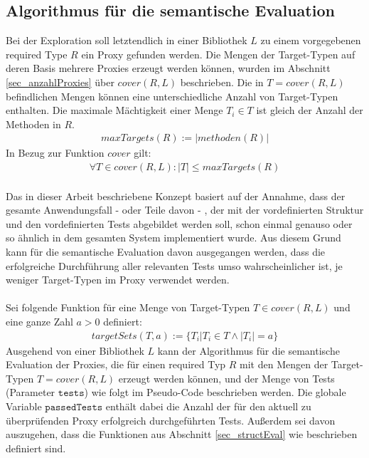 \subsection{Algorithmus für die semantische Evaluation}\label{sec_semEvalAlgo}
Bei der Exploration soll letztendlich in einer Bibliothek $L$ zu einem vorgegebenen required Type $R$ ein Proxy gefunden werden. Die Mengen der Target-Typen auf deren Basis mehrere Proxies erzeugt werden können, wurden im Abschnitt \ref{sec_anzahlProxies} über $\mathit{cover(R,L)}$ beschrieben. Die in $T = \mathit{cover(R,L)}$ befindlichen Mengen können eine unterschiedliche Anzahl von Target-Typen enthalten. Die maximale Mächtigkeit einer Menge $T_i \in T$ ist gleich der Anzahl der Methoden in $R$.
\begin{gather*}
\mathit{maxTargets(R)} := |\mathit{methoden(R)}|
\end{gather*}
\noindent
In Bezug zur Funktion $\mathit{cover}$ gilt:
\begin{gather*}
\forall T \in \mathit{cover(R,L)} : |T| \leq \mathit{maxTargets(R)}
\end{gather*}
\noindent
\\
Das in dieser Arbeit beschriebene Konzept basiert auf der Annahme, dass der gesamte Anwendungsfall - oder Teile davon - , der mit der vordefinierten Struktur und den vordefinierten Tests abgebildet werden soll, schon einmal genauso oder so ähnlich in dem gesamten System implementiert wurde. Aus diesem Grund kann für die semantische Evaluation davon ausgegangen werden, dass die erfolgreiche Durchführung aller relevanten Tests umso wahrscheinlicher ist, je weniger Target-Typen im Proxy verwendet werden.
\\\\
Sei folgende Funktion für eine Menge von Target-Typen $T \in \mathit{cover(R,L)}$ und eine ganze Zahl $a > 0$ definiert:
\begin{gather*}
\mathit{targetSets(T,a)} := \{T_i | T_i \in T \wedge |T_i| = a\}
\end{gather*}
\noindent
Ausgehend von einer Bibliothek $L$ kann der Algorithmus für die semantische Evaluation der Proxies, die für einen required Typ $R$ mit den Mengen der Target-Typen $T = \mathit{cover(R, L)}$ erzeugt werden können, und der Menge von Tests (Parameter $\texttt{tests}$) wie folgt im Pseudo-Code beschrieben werden. Die globale Variable $\texttt{passedTests}$ enthält dabei die Anzahl der für den aktuell zu überprüfenden Proxy erfolgreich durchgeführten Tests. Außerdem sei davon auszugehen, dass die Funktionen aus Abschnitt \ref{sec_structEval} wie beschrieben definiert sind.
